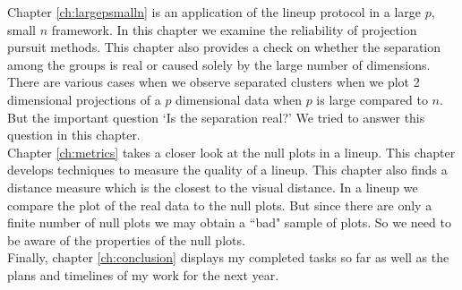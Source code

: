 Chapter \ref{ch:largepsmalln} is an application of the lineup protocol in a large $p$, small $n$ framework. In this chapter we examine the reliability of projection pursuit methods. This chapter also provides a check on whether the separation among the groups is real or caused solely by the large number of dimensions. There are various cases when we observe separated clusters when we plot 2 dimensional projections of a $p$ dimensional data when $p$ is large compared to $n$. But the important question `Is the separation real?' We tried to answer this question in this chapter. \\

Chapter \ref{ch:metrics} takes a closer look at the null plots in a lineup. This chapter develops techniques to measure the quality of a lineup. This chapter also finds a distance measure which is the closest to the visual distance. In a lineup we compare the plot of the real data to the null plots. But since there are only a finite number of null plots we may obtain a ``bad" sample of plots. So we need to be aware of the properties of the null plots. \\

%

Finally, chapter \ref{ch:conclusion} displays my completed tasks so far as well as the plans and timelines of my work for the next year. 

